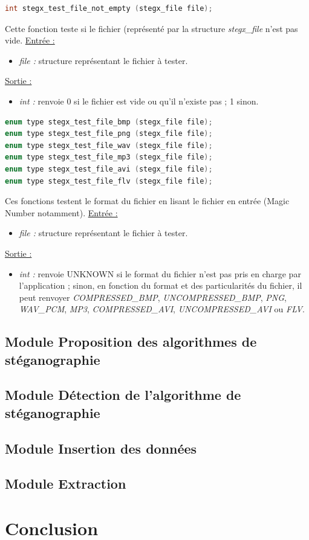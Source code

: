 \documentclass[11pt]{article}
\begin{document}
\begin{lstlisting}[language=c]
int stegx_test_file_not_empty (stegx_file file);
\end{lstlisting}

Cette fonction teste si le fichier (représenté par la structure \textit{stegx\_file}
n'est pas vide. 
\newline
\underline{Entrée :}
\begin{itemize}
\item \textit{file :} structure représentant le fichier à tester.
\end{itemize}
\underline{Sortie :} 
\begin{itemize}
\item \textit{int :} renvoie 0 si le fichier est vide ou qu'il n'existe pas ; 1 sinon. 
\end{itemize}

\begin{lstlisting}[language=c]
enum type stegx_test_file_bmp (stegx_file file);
enum type stegx_test_file_png (stegx_file file);
enum type stegx_test_file_wav (stegx_file file);
enum type stegx_test_file_mp3 (stegx_file file);
enum type stegx_test_file_avi (stegx_file file);
enum type stegx_test_file_flv (stegx_file file);
\end{lstlisting}

Ces fonctions testent le format du fichier en lisant le fichier en entrée 
(Magic Number notamment). 
\newline
\underline{Entrée :} 
\begin{itemize}
\item \textit{file :} structure représentant le fichier à tester. 
\end{itemize}
\underline{Sortie :} 
\begin{itemize}
\item \textit{int :} renvoie UNKNOWN si le format du fichier n'est pas pris en 
charge par l'application ; sinon, en fonction du format et des particularités 
du fichier, il peut renvoyer \textit{COMPRESSED\_BMP}, \textit{UNCOMPRESSED\_BMP}, 
\textit{PNG}, \textit{WAV\_PCM}, \textit{MP3}, \textit{COMPRESSED\_AVI}, 
\textit{UNCOMPRESSED\_AVI} ou \textit{FLV}. 
\newline 
\end{itemize}

\subsection{Module Proposition des algorithmes 
de stéganographie}
\subsection{Module Détection de l'algorithme de
stéganographie}
\subsection{Module Insertion des données}
\subsection{Module Extraction}

\section{Conclusion}
\end{document}
